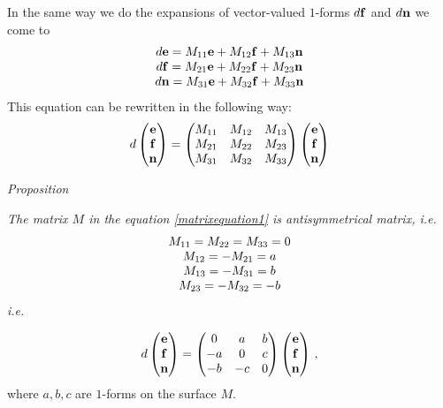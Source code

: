 \documentclass[12pt]{article}
\theoremstyle{theorem}
\numberwithin{equation}{section}
\begin{document}
{In the same way we do the expansions of vector-valued $1$-forms $d{\bf f}$ and $d{\bf n}$ we come to
                 \begin{equation*}
                \begin{matrix}
                d{\bf e}=M_{11}{\bf e}+M_{12}{\bf f}+M_{13}{\bf n}\cr
                d{\bf f}=M_{21}{\bf e}+M_{22}{\bf f}+M_{23}{\bf n}\cr
                d{\bf n}=M_{31}{\bf e}+M_{32}{\bf f}+M_{33}{\bf n}\cr
                \end{matrix}
                    \end{equation*}
   This equation can be rewritten in the following way:
                  \begin{equation}\label{matrixequation1}
                       d
                  \begin{pmatrix}
                {\bf e}\cr
                {\bf f}\cr
                {\bf n}\cr
                \end{pmatrix}
                    =
                \begin{pmatrix}
                M_{11} &M_{12} &M_{13}\cr
                M_{21} &M_{22} &M_{23}\cr
                M_{31} &M_{32} &M_{33}\cr
                \end{pmatrix}
                      \begin{pmatrix}
                {\bf e}\cr
                {\bf f}\cr
                {\bf n}\cr
                \end{pmatrix}
                    \end{equation}

       \m

  {\it Proposition} {\it The matrix $M$ in the equation \eqref{matrixequation1} is antisymmetrical matrix, i.e.
                     \begin{equation}
                       \begin{matrix}
                    M_{11}=M_{22}=M_{33}=0\cr
                       M_{12}=-M_{21}=a\cr
                       M_{13}=-M_{31}= b\cr
                       M_{23}=-M_{32}=-b\cr
                       \end{matrix}
                       \end{equation}
i.e.



                      \begin{equation}\label{derivationformulae1}
                    d\begin{pmatrix}
                    {\bf e}\cr{\bf f}\cr{\bf n}\cr
                    \end{pmatrix}=
                    \begin{pmatrix}
                    0&a&b\cr -a&0&c\cr -b&-c&0\cr
                    \end{pmatrix}
                 \begin{pmatrix}
                    {\bf e}\cr{\bf f}\cr{\bf n}\cr
                    \end{pmatrix}\,,
                       \end{equation}
 where $a,b,c$ are $1$-forms on the surface $M$.}


}
\end{document}

